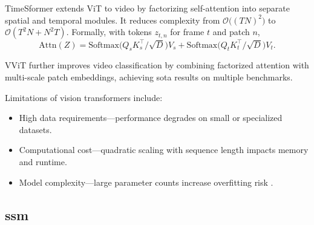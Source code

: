 TimeSformer \cite{bertasius_timesformer_2021} extends ViT to video by factorizing self-attention into separate spatial and temporal modules. It reduces complexity from $\mathcal{O}\bigl((TN)^2\bigr)$ to $\mathcal{O}(T^2N + N^2T)$. Formally, with tokens $z_{t,n}$ for frame $t$ and patch $n$,
\[
\mathrm{Attn}(Z)
= \mathrm{Softmax}\!\bigl(Q_sK_s^\top/\sqrt{D}\bigr)V_s
+ \mathrm{Softmax}\!\bigl(Q_tK_t^\top/\sqrt{D}\bigr)V_t.
\]

VViT \cite{arnab_vvit_2021} further improves video classification by combining factorized attention with multi-scale patch embeddings, achieving \acrlong{sota} results on multiple benchmarks.


Limitations of vision transformers include:
\begin{itemize}

    \item High data requirements—performance degrades on small or specialized datasets.  
    \item Computational cost—quadratic scaling with sequence length impacts memory and runtime.  
    \item Model complexity—large parameter counts increase overfitting risk \cite{lee_enhancing_mamba_s6_2024}.
\end{itemize}





\subsection{\acrlong{ssm}}
\label{ssec:state_space_models}

